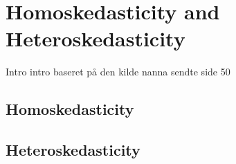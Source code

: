 \newpage
\section{Homoskedasticity and Heteroskedasticity}
Intro intro baseret på den kilde nanna sendte side 50 

\subsection{Homoskedasticity}

\begin{definition}[Homoskedasticity]

\end{definition}
\subsection{Heteroskedasticity} 
